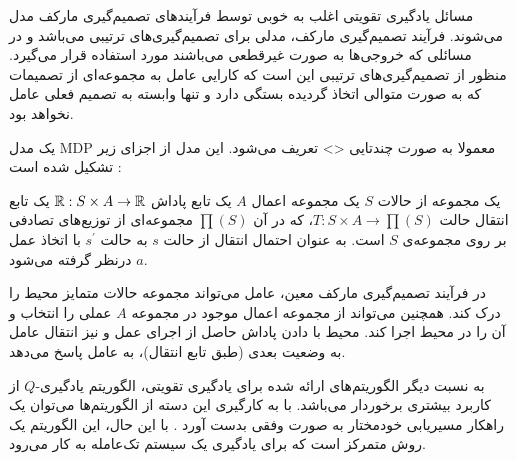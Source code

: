 مسائل یادگیری تقویتی اغلب به خوبی توسط فرآیندهای تصمیم‌گیری مارکف مدل می‌شوند.
فرآیند تصمیم‌گیری مارکف، مدلی برای تصمیم‌گیری‌های ترتیبی می‌باشد و در مسائلی که خروجی‌ها به صورت غیرقطعی می‌باشند مورد استفاده قرار می‌گیرد. منظور از تصمیم‌گیری‌های ترتیبی این است که کارایی عامل به مجموعه‌ای از تصمیمات که به صورت متوالی اتخاذ گردیده بستگی دارد و تنها وابسته به تصمیم فعلی
عامل نخواهد بود.

یک مدل MDP معمولا به صورت چندتایی <> تعریف می‌شود. این مدل از اجزای زیر
تشکیل شده است \cite{Kaelbling1996}:


  یک مجموعه از حالات $S$
  یک مجموعه اعمال $A$
 یک تابع پاداش ${\Bbb R}: S \times A \rightarrow {\Bbb R}$
 یک تابع انتقال حالت $T: S \times A \rightarrow \prod(S)$، که در آن $\prod(S)$ مجموعه‌ای از توزیع‌های تصادفی بر
روی مجموعه‌ی $S$ است.  به عنوان احتمال انتقال از حالت $s$ به حالت $s^{\prime}$ با اتخاذ عمل $a$ درنظر گرفته می‌شود.


در فرآیند تصمیم‌گیری مارکف معین، عامل می‌تواند مجموعه حالات متمایز محیط را درک کند. همچنین می‌تواند از مجموعه اعمال موجود در مجموعه $A$ عملی را انتخاب و آن را در محیط اجرا کند. محیط با دادن پاداش حاصل از اجرای عمل و نیز انتقال عامل به وضعیت بعدی (طبق تابع انتقال)، به عامل پاسخ می‌دهد.

به نسبت دیگر الگوریتم‌های ارائه شده برای یادگیری تقویتی، الگوریتم یادگیری-$Q$ از کاربرد بیشتری برخوردار می‌باشد. با به کارگیری این دسته از الگوریتم‌ها می‌توان یک راهکار مسیریابی خودمختار به صورت وفقی بدست آورد \cite{Nedzelnitsky1987}. با این حال، این الگوریتم یک روش متمرکز است که برای
یادگیری یک سیستم تک‌عامله به کار می‌رود.



